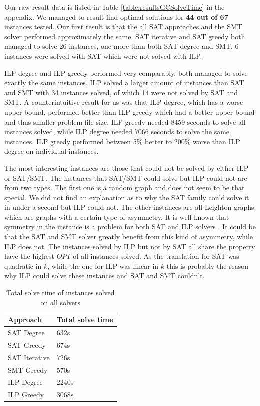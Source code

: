 \documentclass{sig-alternate}
\begin{document}
Our raw result data is listed in Table \ref{table:resultsGCSolveTime} in the appendix.
We managed to result find optimal solutions for \textbf{44 out of 67} instances tested.
Our first result is that the all SAT approaches and the SMT solver performed approximately the same.
SAT iterative and SAT greedy both managed to solve 26 instances, one more than both SAT degree and SMT. 6 instances were solved with SAT which were not solved with ILP.

ILP degree and ILP greedy performed very comparably, both managed to solve exactly the same instances.
ILP solved a larger amount of instances than SAT and SMT with 34 instances solved, of which 14 were not solved by SAT and SMT.
A counterintuitive result for us was that ILP degree, which has a worse upper bound, performed better than ILP greedy which had a better upper bound and thus smaller problem file size.
ILP greedy needed 8459 seconds to solve all instances solved, while ILP degree needed 7066 seconds to solve the same instances.
ILP greedy performed between 5\% better to 200\% worse than ILP degree on individual instances.

The most interesting instances are those that could not be solved by either ILP or SAT/SMT. 
The instances that SAT/SMT could solve but ILP could not are from two types.
The first one is a random graph and does not seem to be that special.
We did not find an explanation as to why the SAT family could solve it in under a second but ILP could not.
The other instances are all Leighton graphs, which are graphs with a certain type of asymmetry.
It is well known that symmetry in the instance is a problem for both SAT and ILP solvers \cite{ramani2004breaking}.
It could be that the SAT and SMT solver greatly benefit from this kind of asymmetry, while ILP does not.
The instances solved by ILP but not by SAT all share the property have the highest $OPT$ of all instances solved.
As the translation for SAT was quadratic in $k$, while the one for ILP was linear in $k$ this is probably the reason
why ILP could solve these instances and SAT and SMT couldn't.

\begin{table}
\begin{tabular}{ |l|l| }
\hline
Approach & Total solve time \\
\hline
SAT Degree &  632s \\
\hline
SAT Greedy & 674s \\
\hline
SAT Iterative & 726s \\
\hline
SMT Greedy & 570s \\
\hline
ILP Degree & 2240s \\
\hline
ILP Greedy &  3068s \\
\hline
\end{tabular}
\caption{Total solve time of instances solved on all solvers}
\label{table:gccombinations}
\end{table}
\end{document}
